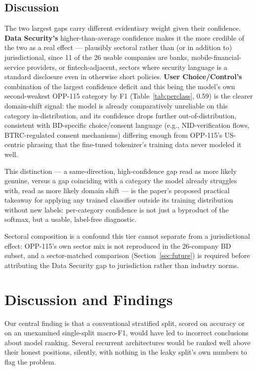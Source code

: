 \documentclass[11pt]{article}
\begin{document}
\subsection{Discussion}

The two largest gaps carry different evidentiary weight given their confidence. \textbf{Data Security's} higher-than-average confidence makes it the more credible of the two as a real effect --- plausibly sectoral rather than (or in addition to) jurisdictional, since 11 of the 26 usable companies are banks, mobile-financial-service providers, or fintech-adjacent, sectors where security language is a standard disclosure even in otherwise short policies. \textbf{User Choice/Control's} combination of the largest confidence deficit and this being the model's own second-weakest OPP-115 category by F1 (Table~\ref{tab:perclass}, 0.59) is the clearer domain-shift signal: the model is already comparatively unreliable on this category in-distribution, and its confidence drops further out-of-distribution, consistent with BD-specific choice/consent language (e.g., NID-verification flows, BTRC-regulated consent mechanisms) differing enough from OPP-115's US-centric phrasing that the fine-tuned tokenizer's training data never modeled it well.

This distinction --- a same-direction, high-confidence gap read as more likely genuine, versus a gap coinciding with a category the model already struggles with, read as more likely domain shift --- is the paper's proposed practical takeaway for applying any trained classifier outside its training distribution without new labels: per-category confidence is not just a byproduct of the softmax, but a usable, label-free diagnostic.

Sectoral composition is a confound this tier cannot separate from a jurisdictional effect: OPP-115's own sector mix is not reproduced in the 26-company BD subset, and a sector-matched comparison (Section~\ref{sec:future}) is required before attributing the Data Security gap to jurisdiction rather than industry norms.

\section{Discussion and Findings}

Our central finding is that a conventional stratified split, scored on accuracy or on an unexamined single-split macro-F1, would have led to incorrect conclusions about model ranking. Several recurrent architectures would be ranked well above their honest positions, silently, with nothing in the leaky split's own numbers to flag the problem.
\end{document}
